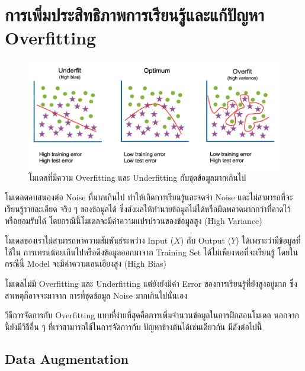 \section{การเพิ่มประสิทธิภาพการเรียนรู้และแก้ปัญหา Overfitting}

\begin{figure}[H]
    \centering
    \includegraphics[width=0.8\linewidth]{fig/overfitting.png}
    \caption{โมเดลที่มีความ Overfitting และ Underfitting กับชุดข้อมูลมากเกินไป}
    \label{fig:overfitting}
\end{figure}

\begin{description}[style=nextline]
    \item[Overfitting] โมเดลตอบสนองต่อ Noise ที่มากเกินไป ทำให้เกิดการเรียนรู้และจดจำ Noise และไม่สามารถที่จะเรียนรู้รายละเอียด%
    จริง ๆ ของข้อมูลได้ ซึ่งส่งผลให้ทำนายข้อมูลไม่ได้หรือผิดพลาดมากกว่าที่คาดไว้หรือยอมรับได้ โดยกรณีนี้โมเดลจะมีค่าความแปรปรวนของข้อมูลสูง 
    (High Variance)
    
    \item[Underfitting] โมเดลของเราไม่สามารถหาความสัมพันธ์ระหว่าง Input ($X$) กับ Output ($Y$) ได้เพราะว่ามีข้อมูลที่ใช้ใน%
    การเทรนน้อยเกินไปหรือดึงข้อมูลออกมาจาก Training Set ได้ไม่เพียงพอที่จะเรียนรู้ โดยในกรณีนี้ Model จะมีค่าความเอนเอียงสูง (High Bias)

    \item[Noisy] โมเดลไม่มี Overfitting และ Underfitting แต่ยังยังมีค่า Error ของการเรียนรู้ที่ยังสูงอยู่มาก ซึ่งสาเหตุก็อาจจะมาจาก%
    การที่ชุดข้อมูล Noise มากเกินไปนั่นเอง
\end{description}

วิธีการจัดการกับ Overfitting แบบที่ง่ายที่สุดคือการเพิ่มจำนวนข้อมูลในการฝึกสอนโมเดล นอกจากนี้ยังมีวิธีอื่น ๆ ที่เราสามารถใช้ในการจัดการกับ%
ปัญหาข้างต้นได้เช่นเดียวกัน มีดังต่อไปนี้

\subsection{Data Augmentation}

